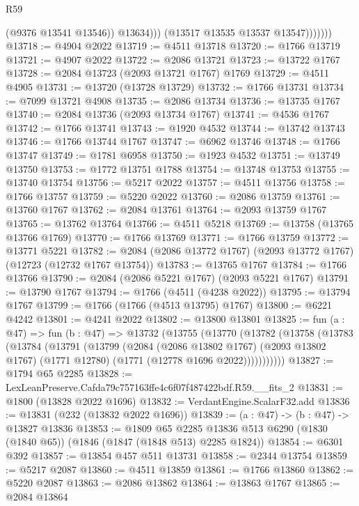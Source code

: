 \begin{lexlean}{R59}
\begin{coremodule}
                        (@9376 @13541 @13546))
                      @13634)))
                (@13517 @13535 @13537 @13547)))))))
@13718 := @4904 @2022
@13719 := @4511 @13718
@13720 := @1766 @13719
@13721 := @4907 @2022
@13722 := @2086 @13721
@13723 := @13722 @1767
@13728 := @2084 @13723 (@2093 @13721 @1767) @1769
@13729 := @4511 @4905
@13731 := @13720 (@13728 @13729)
@13732 := @1766 @13731
@13734 := @7099 @13721 @4908
@13735 := @2086 @13734
@13736 := @13735 @1767
@13740 := @2084 @13736 (@2093 @13734 @1767)
@13741 := @4536 @1767
@13742 := @1766 @13741
@13743 := @1920 @4532
@13744 := @13742 @13743
@13746 := @1766 @13744 @1767
@13747 := @6962 @13746
@13748 := @1766 @13747
@13749 := @1781 @6958
@13750 := @1923 @4532
@13751 := @13749 @13750
@13753 := @1772 @13751 @1788
@13754 := @13748 @13753
@13755 := @13740 @13754
@13756 := @5217 @2022
@13757 := @4511 @13756
@13758 := @1766 @13757
@13759 := @5220 @2022
@13760 := @2086 @13759
@13761 := @13760 @1767
@13762 := @2084 @13761
@13764 := @2093 @13759 @1767
@13765 := @13762 @13764
@13766 := @4511 @5218
@13769 := @13758 (@13765 @13766 @1769)
@13770 := @1766 @13769
@13771 := @1766 @13759
@13772 := @13771 @5221
@13782 := @2084 (@2086 @13772 @1767) (@2093 @13772 @1767) (@12723 (@12732 @1767 @13754))
@13783 := @13765 @1767
@13784 := @1766 @13766
@13790 := @2084 (@2086 @5221 @1767) (@2093 @5221 @1767)
@13791 := @13790 @1767
@13794 := @1766 (@4511 (@4238 @2022))
@13795 := @13794 @1767
@13799 := @1766 (@1766 (@4513 @13795) @1767)
@13800 := @6221 @4242
@13801 := @4241 @2022
@13802 := @13800 @13801
@13825 := fun (a : @47) =>
  fun (b : @47) =>
  @13732
    (@13755
      (@13770
        (@13782
          (@13758
            (@13783
              (@13784
                (@13791
                  (@13799
                    (@2084
                      (@2086 @13802 @1767)
                      (@2093 @13802 @1767)
                      (@1771 @12780)
                      (@1771 (@12778 @1696 @2022)))))))))))
@13827 := @1794 @65 @2285
@13828 := LexLeanPreserve.Cafda79c757163ffe4c6f07f487422bdf.R59.__fits_2
@13831 := @1800 (@13828 @2022 @1696)
@13832 := VerdantEngine.ScalarF32.add
@13836 := @13831 (@232 (@13832 @2022 @1696))
@13839 := (a : @47) -> (b : @47) -> @13827 @13836
@13853 := @1809
    @65
    @2285
    @13836
    @513
    @6290
    (@1830 (@1840 @65))
    (@1846 (@1847 (@1848 @513) @2285 @1824))
@13854 := @6301 @392
@13857 := @13854 @457 @511 @13731
@13858 := @2344 @13754
@13859 := @5217 @2087
@13860 := @4511 @13859
@13861 := @1766 @13860
@13862 := @5220 @2087
@13863 := @2086 @13862
@13864 := @13863 @1767
@13865 := @2084 @13864

\end{coremodule}
\end{lexlean}
